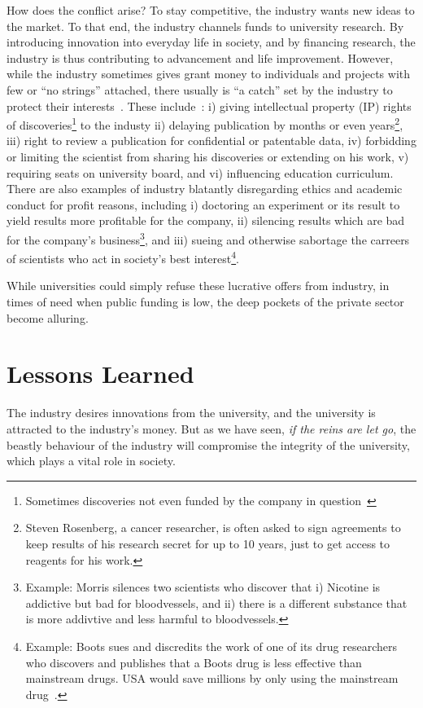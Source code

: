 \documentclass[draft,11pt,openright,monochrome,british,a4paper]{scrartcl}
\begin{document}
How does the conflict arise? To stay competitive, the industry wants
new ideas to the market. To that end, the industry channels funds to
university research. By introducing innovation into everyday life in
society, and by financing research, the industry is thus contributing
to advancement and life improvement. However, while the industry
sometimes gives grant money to individuals and projects with few or
``no strings'' attached, there usually is ``a catch'' set by the
industry to protect their interests~\cite{pain2008}. These
include~\cite{pain2008,washburn2001,resnik2003}: i) giving
intellectual property (IP) rights of discoveries\footnote{Sometimes
  discoveries not even funded by the company in
  question~\cite{washburn2001}} to the industy ii) delaying
publication by months or even years\footnote{Steven Rosenberg, a
  cancer researcher, is often asked to sign agreements to keep results
  of his research secret for up to 10 years, just to get access to
  reagents for his work.\cite{washburn2001}}, iii) right to review a
publication for confidential or patentable data, iv) forbidding or
limiting the scientist from sharing his discoveries or extending on
his work, v) requiring seats on university board, and vi) influencing
education curriculum. There are also examples of industry blatantly
disregarding ethics and academic conduct for profit reasons, including
i) doctoring an experiment or its result to yield results more
profitable for the company, ii) silencing results which are bad for
the company's business\footnote{Example: Morris silences two
  scientists who discover that i) Nicotine is addictive but bad for
  bloodvessels, and ii) there is a different substance that is more
  addivtive and less harmful to bloodvessels.}, and iii) sueing and
otherwise sabortage the carreers of scientists who act in society's
best interest\footnote{Example: Boots sues and discredits the work of
  one of its drug researchers who discovers and publishes that a Boots
  drug is less effective than mainstream drugs. USA would save
  millions by only using the mainstream drug~\cite{resnik2003}.}.

While universities could simply refuse these lucrative offers from
industry, in times of need when public funding is low, the deep
pockets of the private sector become alluring.

\section{Lessons Learned}
The industry desires innovations from the university, and the
university is attracted to the industry's money. But as we have seen,
\emph{if the reins are let go}, the beastly behaviour of the industry
will compromise the integrity of the university, which plays a vital
role in society.
\end{document}
